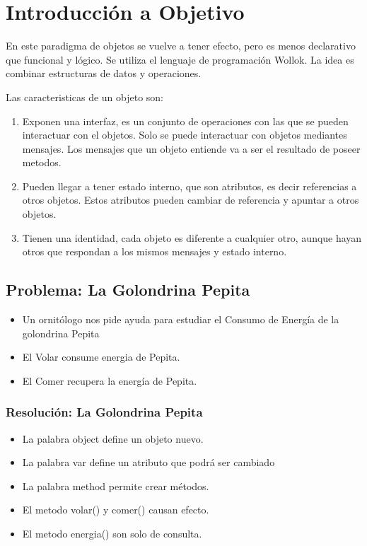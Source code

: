 \documentclass[11pt,a4paper]{article}
\begin{document}
\pagestyle{fancy}
\lhead{\sc }
\chead{}
\rhead{\rightmark}
\lfoot{}
\cfoot{}
\rfoot{\thepage}

%




\newpage

\section{Introducción a Objetivo}
En este paradigma de objetos se vuelve a tener efecto, pero es menos declarativo que funcional y lógico. Se utiliza el lenguaje de programación Wollok. La idea es combinar estructuras de datos y operaciones.

Las caracteristicas de un objeto son:

\begin{enumerate}
	\item Exponen una interfaz, es un conjunto de operaciones con las que se pueden interactuar con el objetos. Solo se puede interactuar con objetos mediantes mensajes. Los mensajes que un objeto entiende va a ser el resultado de poseer metodos.
	\item Pueden llegar a tener estado interno, que son atributos, es decir referencias a otros objetos. Estos atributos pueden cambiar de referencia y apuntar a otros objetos.
	\item Tienen una identidad, cada objeto es diferente a cualquier otro, aunque hayan otros que respondan a los mismos mensajes y estado interno.
\end{enumerate}

\subsection{Problema: La Golondrina Pepita}

\begin{itemize}
	\item Un ornitólogo nos pide ayuda para estudiar el Consumo de Energía de la golondrina Pepita
	\item El Volar consume energia de Pepita.
	\item El Comer recupera la energía de Pepita.
\end{itemize}

\subsubsection{Resolución: La Golondrina Pepita}
\begin{itemize}
	\item La palabra object define un objeto nuevo.
	\item La palabra var define un atributo que podrá ser cambiado
	\item La palabra method permite crear métodos.
	\item El metodo volar() y comer() causan efecto.
	\item El metodo energia() son solo de consulta.
\end{itemize}
\end{document}
